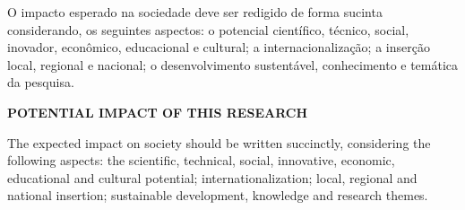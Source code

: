 


	
	\imprimircapa
	\imprimirfolhaderosto
	
	
	\begin{resumo}
		O impacto esperado na sociedade deve ser redigido de forma sucinta considerando, os seguintes aspectos: o potencial científico, técnico, social, inovador, econômico, educacional e cultural; a internacionalização; a inserção local, regional e nacional;  o desenvolvimento sustentável, conhecimento e temática da pesquisa. 
		
		\vspace*{0.5cm}
		
		\begin{center}
			\noindent\textbf{\MakeUppercase{POTENTIAL IMPACT OF THIS RESEARCH }}
		\end{center}
		
		
		\vspace*{0.5cm}
		
		The expected impact on society should be written succinctly, considering the following aspects: the scientific, technical, social, innovative, economic, educational and cultural potential; internationalization; local, regional and national insertion; sustainable development, knowledge and research themes.
		
	\end{resumo}
	
